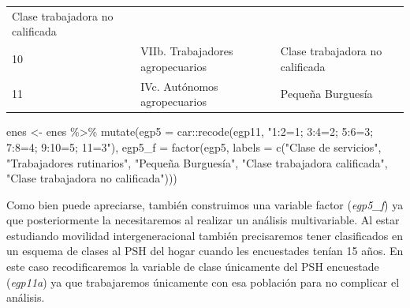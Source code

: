 \documentclass[
]{book}
\newenvironment{Shaded}{\begin{snugshade}}{\end{snugshade}}
\newcommand{\AttributeTok}[1]{\textcolor[rgb]{0.77,0.63,0.00}{#1}}
\newcommand{\FunctionTok}[1]{\textcolor[rgb]{0.00,0.00,0.00}{#1}}
\newcommand{\NormalTok}[1]{#1}
\newcommand{\OtherTok}[1]{\textcolor[rgb]{0.56,0.35,0.01}{#1}}
\newcommand{\SpecialCharTok}[1]{\textcolor[rgb]{0.00,0.00,0.00}{#1}}
\newcommand{\StringTok}[1]{\textcolor[rgb]{0.31,0.60,0.02}{#1}}
\begin{document}
\begin{longtable}[]{@{}lll@{}}
\begin{minipage}[t]{0.29\columnwidth}
Clase trabajadora no calificada\strut
\end{minipage}\tabularnewline
\begin{minipage}[t]{0.07\columnwidth}\raggedright
10\strut
\end{minipage} & \begin{minipage}[t]{0.55\columnwidth}\raggedright
VIIb. Trabajadores agropecuarios\strut
\end{minipage} & \begin{minipage}[t]{0.29\columnwidth}\raggedright
Clase trabajadora no calificada\strut
\end{minipage}\tabularnewline
\begin{minipage}[t]{0.07\columnwidth}\raggedright
11\strut
\end{minipage} & \begin{minipage}[t]{0.55\columnwidth}\raggedright
IVc. Autónomos agropecuarios\strut
\end{minipage} & \begin{minipage}[t]{0.29\columnwidth}\raggedright
Pequeña Burguesía\strut
\end{minipage}\tabularnewline
\bottomrule
\end{longtable}

\begin{Shaded}
\begin{Highlighting}[]
\NormalTok{enes }\OtherTok{\textless{}{-}}\NormalTok{ enes }\SpecialCharTok{\%\textgreater{}\%} 
    \FunctionTok{mutate}\NormalTok{(}\AttributeTok{egp5 =}\NormalTok{ car}\SpecialCharTok{::}\FunctionTok{recode}\NormalTok{(egp11, }\StringTok{"1:2=1; 3:4=2; 5:6=3; 7:8=4; 9:10=5; 11=3"}\NormalTok{),}
                 \AttributeTok{egp5\_f =} \FunctionTok{factor}\NormalTok{(egp5, }\AttributeTok{labels =} \FunctionTok{c}\NormalTok{(}\StringTok{"Clase de servicios"}\NormalTok{, }\StringTok{"Trabajadores rutinarios"}\NormalTok{, }
                                                                                 \StringTok{"Pequeña Burguesía"}\NormalTok{, }\StringTok{"Clase trabajadora calificada"}\NormalTok{,}
                                                                                 \StringTok{"Clase trabajadora no calificada"}\NormalTok{)))}
\end{Highlighting}
\end{Shaded}

Como bien puede apreciarse, también construimos una variable factor (\emph{egp5\_f}) ya que posteriormente la necesitaremos al realizar un análisis multivariable. Al estar estudiando movilidad intergeneracional también precisaremos tener clasificados en un esquema de clases al PSH del hogar cuando les encuestades tenían 15 años. En este caso recodificaremos la variable de clase únicamente del PSH encuestade (\emph{egp11a}) ya que trabajaremos únicamente con esa población para no complicar el análisis.
\end{document}
